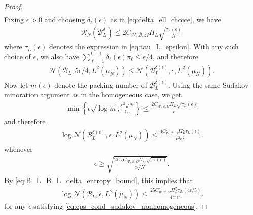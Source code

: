 \documentclass{article}
\def\cB{{\mathcal{B}}}
\def\cN{{\mathcal{N}}}
\def\cR{{\mathcal{R}}}
\def\cW{{\mathcal{W}}}
\begin{document}
\begin{appendices}
\begin{proof}
\begin{align}
\end{align}
Fixing $\epsilon > 0$ and choosing $\delta_\ell(\epsilon)$ as in \eqref{eq:delta_ell_choice}, we have
\begin{align}
    \cR_N(\cB_L^\delta) \leq 2 C_{\cW, \cB, \Omega} \Pi_L \sqrt{\frac{\tau_L(\epsilon)}{N}}
\end{align}
where $\tau_L(\epsilon)$ denotes the expression in \eqref{eq:tau_L_epsilon}. With any such choice of $\epsilon$, we also have $\sum_{\ell=1}^{L-1} \delta_\ell(\epsilon) \pi_\ell \leq \epsilon/4$, and therefore
\begin{align} \label{eq:B_L_B_L_delta_entropy_bound}
    \cN \left( \cB_L, 5 \epsilon/4, L^2(\mu_N) \right) \leq \cN \left( \cB_L^{\delta(\epsilon)}, \epsilon, L^2(\mu_N) \right).
\end{align}
Now let $m(\epsilon)$ denote the packing number of $\cB_L^{\delta(\epsilon)}$. Using the same Sudakov minoration argument as in the homogeneous case, we get
\begin{align} \label{eq:min_bound_nonhomogeneous}
     \min \left\{ \epsilon \sqrt{\log m}, \frac{\epsilon^2 \sqrt{N}}{C_L} \right\} \leq \frac{2 C_{\cW, \cB, \Omega} \Pi_L \sqrt{\tau_L(\epsilon)}}{c}
\end{align}
and therefore
\begin{align} 
    \log \cN(\cB_L^{\delta(\epsilon)}, \epsilon, L^2(\mu_N)) \leq \frac{4 C_{\cW, \cB, \Omega}^2 \Pi_L^2 \tau_L(\epsilon)}{c^2 \epsilon^2}.
\end{align}
whenever
\begin{align} \label{eq:eps_cond_sudakov_nonhomogeneous}
     \epsilon \geq \sqrt{ \frac{2 C_L C_{\cW, \cB, \Omega} \Pi_L \sqrt{\tau_L(\epsilon)}}{c \sqrt{N}}}.
\end{align}
By \eqref{eq:B_L_B_L_delta_entropy_bound}, this implies that
\begin{align} \label{eq:empirical_L2_bound_nonhomogeneous}
    \log \cN(\cB_L, \epsilon, L^2(\mu_N)) \leq \frac{25  C_{\cW, \cB, \Omega}^2 \Pi_L^2 \tau_L(4 \epsilon/5)}{4 c^2 \epsilon^2}.
\end{align}
for any $\epsilon$ satisfying \eqref{eq:eps_cond_sudakov_nonhomogeneous}.




\end{proof}
\end{appendices}
\end{document}
